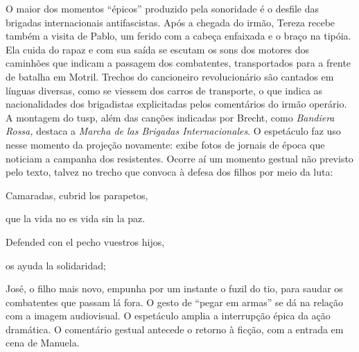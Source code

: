 
O maior dos momentos “épicos” produzido pela sonoridade é o desfile das
brigadas internacionais antifascistas. Após a chegada do irmão, Tereza
recebe também a visita de Pablo, um ferido com a cabeça enfaixada e o
braço na tipóia. Ela cuida do rapaz e com sua saída se escutam os sons
dos motores dos caminhões que indicam a passagem dos combatentes,
transportados para a frente de batalha em Motril. Trechos do cancioneiro
revolucionário são cantados em línguas diversas, como se viessem dos
carros de transporte, o que indica as nacionalidades dos brigadistas
explicitadas pelos comentários do irmão operário. A montagem do {\sc tusp},
além das canções indicadas por Brecht, como {\it Bandiera Rossa,}
destaca a {\it Marcha de las Brigadas Internacionales}. O espetáculo faz
uso nesse momento da projeção novamente: exibe fotos de jornais de época
que noticiam a campanha dos resistentes. Ocorre aí um momento gestual
não previsto pelo texto, talvez no trecho que convoca à defesa dos
filhos por meio da luta:

\startblockquote
Camaradas, cubrid los parapetos,

que la vida no es vida sin la paz.

Defended con el pecho vuestros hijos,

os ayuda la solidaridad;
\stopblockquote


José, o filho mais novo, empunha por um instante o fuzil do tio, para
saudar os combatentes que passam lá fora. O gesto de “pegar em armas” se
dá na relação com a imagem audiovisual. O espetáculo amplia a
interrupção épica da ação dramática. O comentário gestual antecede o
retorno à ficção, com a entrada em cena de Manuela.




